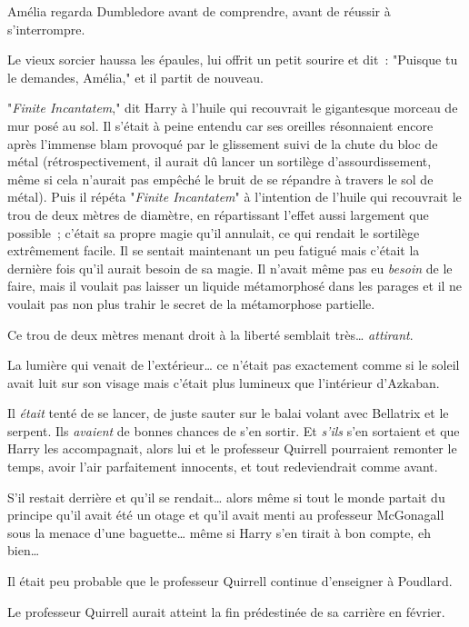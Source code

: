 Amélia regarda Dumbledore avant de comprendre, avant de réussir à s'interrompre.

Le vieux sorcier haussa les épaules, lui offrit un petit sourire et dit~: "Puisque tu le demandes, Amélia," et il partit de nouveau.

\later

"\emph{Finite Incantatem}," dit Harry à l'huile qui recouvrait le gigantesque morceau de mur posé au sol. Il s'était à peine entendu car ses oreilles résonnaient encore après l'immense blam provoqué par le glissement suivi de la chute du bloc de métal (rétrospectivement, il aurait dû lancer un sortilège d'assourdissement, même si cela n'aurait pas empêché le bruit de se répandre à travers le sol de métal). Puis il répéta "\emph{Finite Incantatem}" à l'intention de l'huile qui recouvrait le trou de deux mètres de diamètre, en répartissant l'effet aussi largement que possible~; c'était sa propre magie qu'il annulait, ce qui rendait le sortilège extrêmement facile. Il se sentait maintenant un peu fatigué mais c'était la dernière fois qu'il aurait besoin de sa magie. Il n'avait même pas eu \emph{besoin} de le faire, mais il voulait pas laisser un liquide métamorphosé dans les parages et il ne voulait pas non plus trahir le secret de la métamorphose partielle.

Ce trou de deux mètres menant droit à la liberté semblait très… \emph{attirant}.

La lumière qui venait de l'extérieur… ce n'était pas exactement comme si le soleil avait luit sur son visage mais c'était plus lumineux que l'intérieur d'Azkaban.

Il \emph{était} tenté de se lancer, de juste sauter sur le balai volant avec Bellatrix et le serpent. Ils \emph{avaient} de bonnes chances de s'en sortir. Et \emph{s'ils} s'en sortaient et que Harry les accompagnait, alors lui et le professeur Quirrell pourraient remonter le temps, avoir l'air parfaitement innocents, et tout redeviendrait comme avant.

S'il restait derrière et qu'il se rendait… alors même si tout le monde partait du principe qu'il avait été un otage et qu'il avait menti au professeur McGonagall sous la menace d'une baguette… même si Harry s'en tirait à bon compte, eh bien…

Il était peu probable que le professeur Quirrell continue d'enseigner à Poudlard.

Le professeur Quirrell aurait atteint la fin prédestinée de sa carrière en février.

